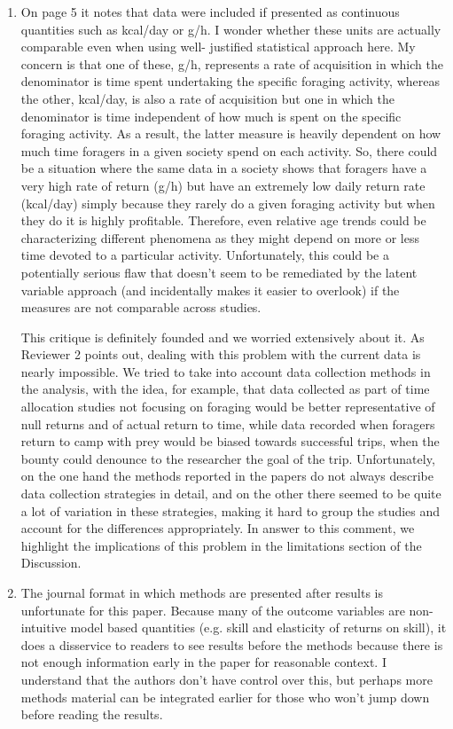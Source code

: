\documentclass{article}
\newcommand{\rev}[1]{{\color{ForestGreen}#1}}
\begin{document}
\begin{enumerate}
    \item On page 5 it notes that data were included if presented as continuous quantities such as  kcal/day or g/h. I wonder whether these units are actually comparable even when using well- justified statistical approach here. My concern is that one of these, g/h, represents a rate of  acquisition in which the denominator is time spent undertaking the specific foraging activity,  whereas the other, kcal/day, is also a rate of acquisition but one in which the denominator is time  independent of how much is spent on the specific foraging activity. As a result, the latter measure is heavily dependent on how much time foragers in a given society spend on each activity. So, there could be a situation where the same data in a society shows that foragers have a very high  rate of return (g/h) but have an extremely low daily return rate (kcal/day) simply because they  rarely do a given foraging activity but when they do it is highly profitable. Therefore, even relative age trends could be characterizing different phenomena as they might depend on more or less time devoted to a particular activity. Unfortunately, this could be a potentially serious flaw that doesn't seem to be remediated  by the latent variable approach (and incidentally makes it easier to overlook) if the measures are not comparable across studies.
    
\rev{This critique is definitely founded and we worried extensively about it. As Reviewer 2 points out, dealing with this problem with the current data is nearly impossible. We tried to take into account data collection methods in the analysis, with the idea, for example, that data collected as part of time allocation studies not focusing on foraging would be better representative of null returns and of actual return to time, while data recorded when foragers return to camp with prey would be biased towards successful trips, when the bounty could denounce to the researcher the goal of the trip. Unfortunately, on the one hand the methods reported in the papers do not always describe data collection strategies in detail, and on the other there seemed to be quite a lot of variation in these strategies, making it hard to group the studies and account for the differences appropriately. In answer to this comment, we highlight the implications of this problem in the limitations section of the Discussion.}

    \item The journal format in which methods are presented after results is unfortunate for this paper.  Because many of the outcome variables are non-intuitive model based quantities (e.g. skill and  elasticity of returns on skill), it does a disservice to readers to see results before the methods  because there is not enough information early in the paper for reasonable context. I understand  that the authors don't have control over this, but perhaps more methods material can be integrated earlier for those who won’t jump down before reading the results.
    

\end{enumerate}
\end{document}
